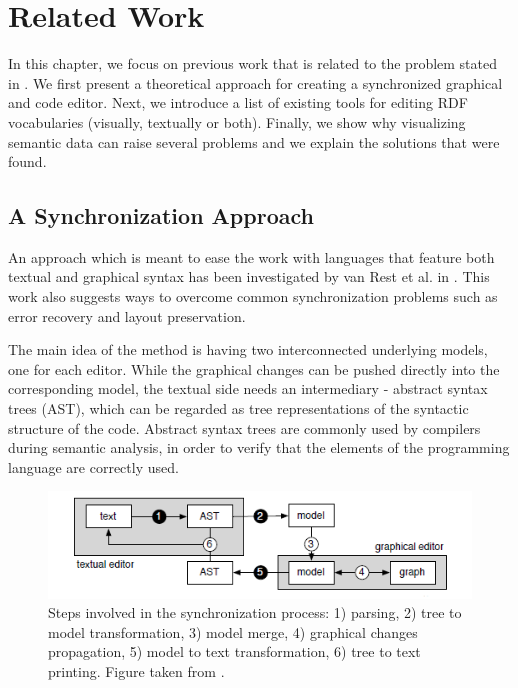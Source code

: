 \chapter{Related Work}
\label{ch:related}

In this chapter, we focus on previous work that is related to the problem stated in . We first present a theoretical approach for creating a synchronized graphical and code editor. Next, we introduce a list of existing tools for editing RDF vocabularies (visually, textually or both). Finally, we show why visualizing semantic data can raise several problems and we explain the solutions that were found.


\section{A Synchronization Approach}

An approach which is meant to ease the work with languages that feature both textual and graphical syntax has been investigated by van Rest et al. in \cite{Rest2013}. This work also suggests ways to overcome common synchronization problems such as error recovery and layout preservation.

The main idea of the method is having two interconnected underlying models, one for each editor. While the graphical changes can be pushed directly into the corresponding model, the textual side needs an intermediary - abstract syntax trees (AST), which can be regarded as tree representations of the syntactic structure of the code. Abstract syntax trees are commonly used by compilers during semantic analysis, in order to verify that the elements of the programming language are correctly used.

\begin{figure}[!htbp]
	\includegraphics[width=\linewidth]{img/robust_real_time_sync.png}
	\caption{Steps involved in the synchronization process: 1) parsing, 2) tree to model transformation, 3) model merge, 4) graphical changes propagation, 5) model to text transformation, 6) tree to text printing. Figure taken from \cite{Rest2013}.}
	\label{img:robust_sync}
\end{figure}

